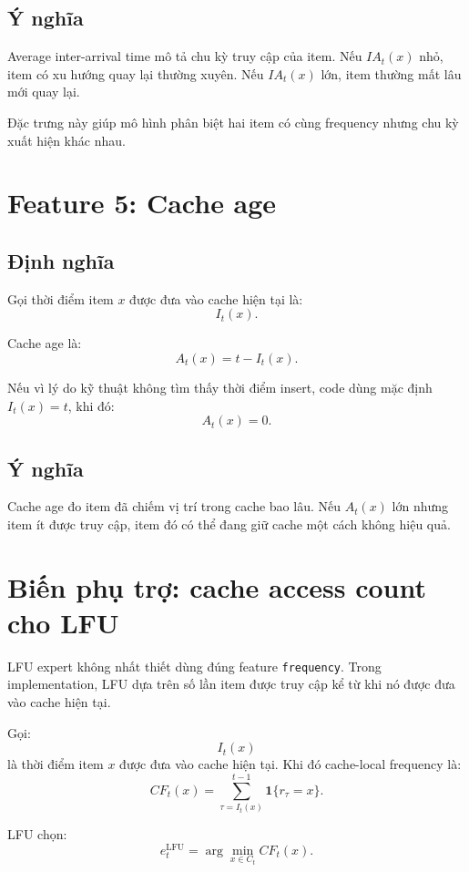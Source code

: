 \documentclass[11pt,a4paper]{article}
\newcommand{\code}[1]{\texttt{#1}}
\newcommand{\ind}[1]{\mathbf{1}\{#1\}}
\begin{document}
\subsection{Ý nghĩa}

Average inter-arrival time mô tả chu kỳ truy cập của item. Nếu \(IA_t(x)\) nhỏ, item có xu hướng quay lại thường xuyên. Nếu \(IA_t(x)\) lớn, item thường mất lâu mới quay lại.

Đặc trưng này giúp mô hình phân biệt hai item có cùng frequency nhưng chu kỳ xuất hiện khác nhau.

\section{Feature 5: Cache age}

\subsection{Định nghĩa}

Gọi thời điểm item \(x\) được đưa vào cache hiện tại là:
\[
    I_t(x).
\]

Cache age là:
\[
    A_t(x)
    =
    t - I_t(x).
\]

Nếu vì lý do kỹ thuật không tìm thấy thời điểm insert, code dùng mặc định \(I_t(x)=t\), khi đó:
\[
    A_t(x)=0.
\]

\subsection{Ý nghĩa}

Cache age đo item đã chiếm vị trí trong cache bao lâu. Nếu \(A_t(x)\) lớn nhưng item ít được truy cập, item đó có thể đang giữ cache một cách không hiệu quả.

\section{Biến phụ trợ: cache access count cho LFU}

LFU expert không nhất thiết dùng đúng feature \code{frequency}. Trong implementation, LFU dựa trên số lần item được truy cập kể từ khi nó được đưa vào cache hiện tại.

Gọi:
\[
    I_t(x)
\]
là thời điểm item \(x\) được đưa vào cache hiện tại. Khi đó cache-local frequency là:
\[
    CF_t(x)
    =
    \sum_{\tau=I_t(x)}^{t-1}
    \ind{r_{\tau}=x}.
\]

LFU chọn:
\[
    e_t^{\mathrm{LFU}}
    =
    \arg\min_{x\in C_t}
    CF_t(x).
\]
\end{document}
